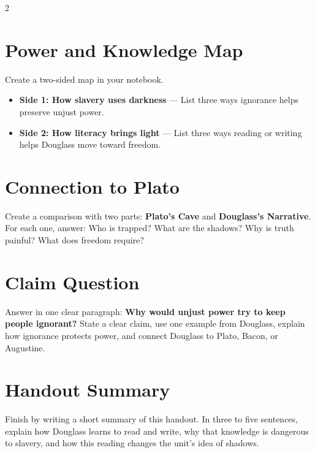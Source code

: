 \documentclass[12pt]{article}
\begin{document}
\begin{multicols}{2}
\section*{Power and Knowledge Map}
Create a two-sided map in your notebook.

\begin{itemize}[leftmargin=*, itemsep=0.2em]
\item \textbf{Side 1: How slavery uses darkness} --- List three ways ignorance helps preserve unjust power.
\item \textbf{Side 2: How literacy brings light} --- List three ways reading or writing helps Douglass move toward freedom.
\end{itemize}

\section*{Connection to Plato}
Create a comparison with two parts: \textbf{Plato's Cave} and \textbf{Douglass's Narrative}. For each one, answer: Who is trapped? What are the shadows? Why is truth painful? What does freedom require?

\section*{Claim Question}
Answer in one clear paragraph: \textbf{Why would unjust power try to keep people ignorant?} State a clear claim, use one example from Douglass, explain how ignorance protects power, and connect Douglass to Plato, Bacon, or Augustine.

\section*{Handout Summary}
Finish by writing a short summary of this handout. In three to five sentences, explain how Douglass learns to read and write, why that knowledge is dangerous to slavery, and how this reading changes the unit's idea of shadows.

\end{multicols}
\end{document}
